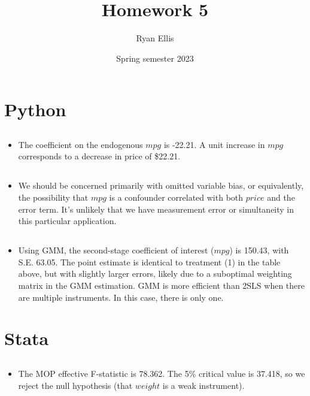 \documentclass{article}
\title{Homework 5}
\author{Ryan Ellis}
\date{Spring semester 2023}
\begin{document}
  
\maketitle

\section{Python}
\subsection{}
\begin{itemize}
    \item The coefficient on the endogenous $mpg$ is -22.21. A unit increase in $mpg$ corresponds to a decrease in price of \$22.21.
\end{itemize}

\subsection{}
\begin{itemize}
    \item We should be concerned primarily with omitted variable bias, or equivalently, the possibility that $mpg$ is a confounder correlated with both $price$ and the error term. It's unlikely that we have measurement error or simultaneity in this particular application.
\end{itemize}

\subsection{}


\clearpage

\subsection{}
\begin{itemize}
    \item Using GMM, the second-stage coefficient of interest ($mpg$) is 150.43, with S.E. 63.05. The point estimate is identical to treatment (1) in the table above, but with slightly larger errors, likely due to a suboptimal weighting matrix in the GMM estimation. GMM is more efficient than 2SLS when there are multiple instruments. In this case, there is only one.
\end{itemize}


\section{Stata}

\subsection{}
 \centering

\subsection{}
\begin{itemize}
    \item The MOP effective F-statistic is 78.362. The 5\% critical value is 37.418, so we reject the null hypothesis (that $weight$ is a weak instrument).
\end{itemize}
\end{document}
